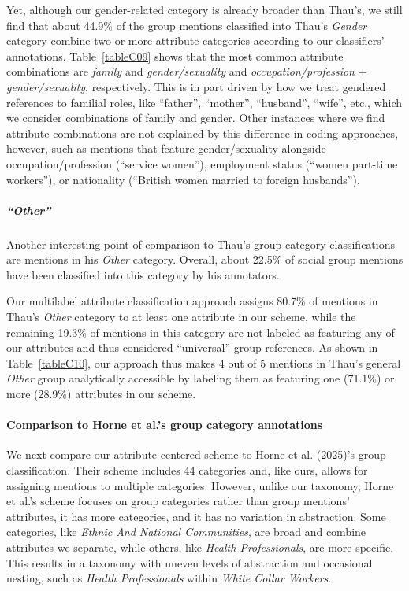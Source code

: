 \documentclass[12pt]{article}
\begin{document}
%

Yet, although our gender-related category is already broader than Thau's, we still find that about 44.9\% of the group mentions classified into Thau's \emph{Gender} category combine two or more attribute categories according to our classifiers' annotations.
Table~\ref{tableC09} shows that the most common attribute combinations are \emph{family} and \emph{gender/sexuality} and \emph{occupation/profession} + \emph{gender/sexuality}, respectively.
This is in part driven by how we treat gendered references to familial roles, like ``father'', ``mother'', ``husband'', ``wife'', etc., which we consider combinations of family and gender.
Other instances where we find attribute combinations are not explained by this difference in coding approaches, however, such as mentions that feature gender/sexuality alongside occupation/profession (``service women''), employment status (``women part-time workers''), or nationality (``British women married to foreign husbands'').

\subparagraph{``Other''}\label{other}

Another interesting point of comparison to Thau's group category classifications are mentions in his \emph{Other} category.
Overall, about 22.5\% of social group mentions have been classified into this category by his annotators.

Our multilabel attribute classification approach assigns 80.7\% of mentions in Thau's \emph{Other} category to at least one attribute in our scheme, while the remaining 19.3\% of mentions in this category are not labeled as featuring any of our attributes and thus considered ``universal'' group references.
As shown in Table~\ref{tableC10}, our approach thus makes 4 out of 5 mentions in Thau's general \emph{Other} group analytically accessible by labeling them as featuring one (71.1\%) or more (28.9\%) attributes in our scheme.

%

\paragraph{Comparison to Horne et al.'s group category annotations}\label{sec-horne_crossvalidation}

We next compare our attribute-centered scheme to Horne et al. (2025)'s group classification.
Their scheme includes 44 categories and, like ours, allows for assigning mentions to multiple categories.
However, unlike our taxonomy, Horne et al.'s scheme focuses on group categories rather than group mentions' attributes, it has more categories, and it has no variation in abstraction.
Some categories, like \emph{Ethnic And National Communities}, are broad and combine attributes we separate, while others, like \emph{Health Professionals}, are more specific.
This results in a taxonomy with uneven levels of abstraction and occasional nesting, such as \emph{Health Professionals} within \emph{White Collar Workers}.
\end{document}
